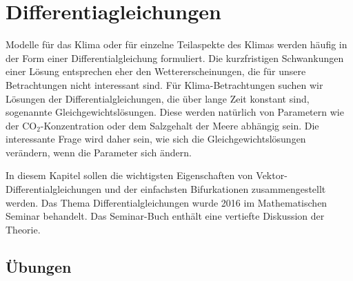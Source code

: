%
%
%
\chapter{Differentiagleichungen\label{chapter:dgl}}
Modelle für das Klima oder für einzelne Teilaspekte des Klimas 
werden häufig in der Form einer Differentialgleichung formuliert.
Die kurzfristigen Schwankungen einer Lösung entsprechen 
eher den Wettererscheinungen, die für unsere Betrachtungen nicht
interessant sind.
Für Klima-Betrachtungen suchen wir Lösungen der Differentialgleichungen,
die über lange Zeit konstant sind, sogenannte Gleichgewichtslösungen.
Diese werden natürlich von Parametern wie der $\text{CO}_2$-Konzentration
oder dem Salzgehalt der Meere abhängig sein.
Die interessante Frage wird daher sein, wie sich die Gleichgewichtslösungen
verändern, wenn die Parameter sich ändern.

In diesem Kapitel sollen die wichtigsten Eigenschaften von
Vektor-Differentialgleichungen und der einfachsten Bifurkationen
zusammengestellt werden.
Das Thema Differentialgleichungen wurde 2016 im Mathematischen Seminar
behandelt.
Das Seminar-Buch \cite{skript:mathsem-dgl} enthält eine vertiefte Diskussion
der Theorie.





\section*{Übungen}
\begin{uebungsaufgaben}
\item

\end{uebungsaufgaben}

